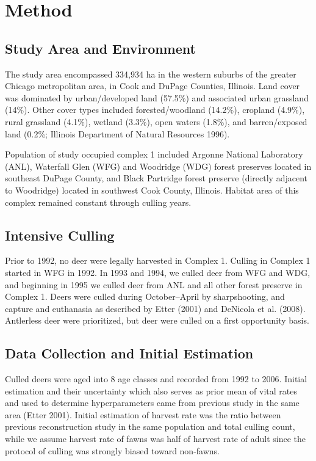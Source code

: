 \documentclass[]{article}
\begin{document}
\section{Method}
\subsection{Study Area and Environment}
The study area encompassed 334,934 ha in the western suburbs of the greater Chicago metropolitan area, in Cook and DuPage Counties, Illinois. Land cover was dominated by urban/developed land (57.5\%) and associated urban grassland (14\%).  Other cover types included forested/woodland (14.2\%), cropland (4.9\%), rural grassland (4.1\%), wetland (3.3\%), open waters (1.8\%), and barren/exposed land (0.2\%; Illinois Department of Natural Resources 1996).

Population of study occupied complex 1 included Argonne National Laboratory (ANL), Waterfall Glen (WFG) and Woodridge (WDG) forest preserves located in southeast DuPage County, and Black Partridge forest preserve (directly adjacent to Woodridge) located in southwest Cook County, Illinois. Habitat area of this complex remained constant through culling years.
\subsection{Intensive Culling}
Prior to 1992, no deer were legally harvested in Complex 1. Culling in Complex 1 started in WFG in 1992. In 1993 and 1994, we culled deer from WFG and WDG, and beginning in 1995 we culled deer from ANL and all other forest preserve in Complex 1. Deers were culled during October–April by sharpshooting, and capture and euthanasia as described by Etter (2001) and DeNicola et al. (2008).  Antlerless deer were prioritized, but deer were culled on a first opportunity basis.

\subsection{Data Collection and Initial Estimation}
Culled deers were aged into 8 age classes and recorded from 1992 to 2006. Initial estimation and their uncertainty which also serves as prior mean of vital rates and used to determine hyperparameters came from previous study in the same area (Etter 2001). Initial estimation of harvest rate was the ratio between previous reconstruction study in the same population and total culling count, while we assume harvest rate of fawns was half of harvest rate of adult since the protocol of culling was strongly biased toward non-fawns. 
\end{document}
